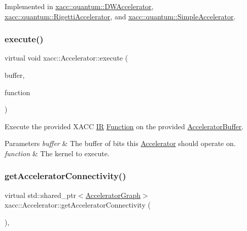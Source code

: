 Implemented in \hyperlink{a01133_a718d7cb51a35e694d960385e1ea2f99f}{xacc\+::quantum\+::\+D\+W\+Accelerator}, \hyperlink{a01165_a731551c94b1abef40d2cf032e8712df6}{xacc\+::quantum\+::\+Rigetti\+Accelerator}, and \hyperlink{a01185_adb9393692e9f484df241aa5d014030d1}{xacc\+::quantum\+::\+Simple\+Accelerator}.

\mbox{\label{a01613_a89b3f3e6294f228abf03a410b0fb1674}} 
\subsubsection{\texorpdfstring{execute()}{execute()}}
{\footnotesize\ttfamily virtual void xacc\+::\+Accelerator\+::execute (\begin{DoxyParamCaption}\item[{std\+::shared\+\_\+ptr$<$ \hyperlink{a01625}{Accelerator\+Buffer} $>$}]{buffer,  }\item[{const std\+::shared\+\_\+ptr$<$ \hyperlink{a01653}{Function} $>$}]{function }\end{DoxyParamCaption})\hspace{0.3cm}{\ttfamily [pure virtual]}}

Execute the provided X\+A\+CC \hyperlink{a01677}{IR} \hyperlink{a01653}{Function} on the provided \hyperlink{a01625}{Accelerator\+Buffer}.


\begin{DoxyParams}{Parameters}
{\em buffer} & The buffer of bits this \hyperlink{a01613}{Accelerator} should operate on. \\
\hline
{\em function} & The kernel to execute. \\
\hline
\end{DoxyParams}
\mbox{\label{a01613_adfed940ce1fa476b009344ddf5a4bbc3}} 
\subsubsection{\texorpdfstring{get\+Accelerator\+Connectivity()}{getAcceleratorConnectivity()}}
{\footnotesize\ttfamily virtual std\+::shared\+\_\+ptr$<$\hyperlink{a01713}{Accelerator\+Graph}$>$ xacc\+::\+Accelerator\+::get\+Accelerator\+Connectivity (\begin{DoxyParamCaption}{ }\end{DoxyParamCaption})\hspace{0.3cm}{\ttfamily [inline]}, {\ttfamily [virtual]}}


